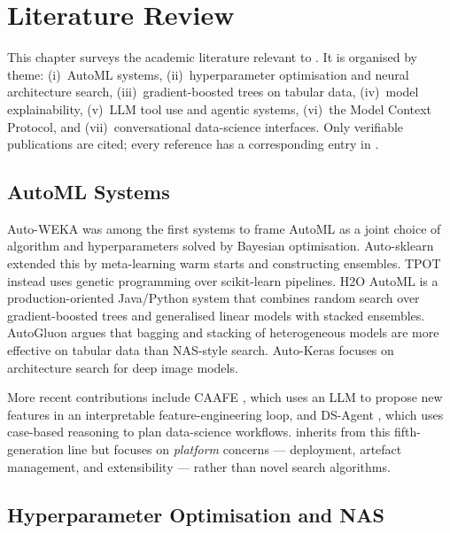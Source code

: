 \chapter{Literature Review}
\label{ch:litreview}

This chapter surveys the academic literature relevant to \projname{}.
It is organised by theme: (i)~AutoML systems, (ii)~hyperparameter
optimisation and neural architecture search, (iii)~gradient-boosted
trees on tabular data, (iv)~model explainability, (v)~LLM tool use
and agentic systems, (vi)~the Model Context Protocol, and
(vii)~conversational data-science interfaces. Only verifiable
publications are cited; every reference has a corresponding entry in
.

\section{AutoML Systems}
\label{sec:lit-automl}

Auto-WEKA \citep{thornton2013autoweka} was among the first systems to
frame AutoML as a joint choice of algorithm and hyperparameters
solved by Bayesian optimisation. Auto-sklearn
\citep{feurer2015autosklearn} extended this by meta-learning warm
starts and constructing ensembles. TPOT \citep{olson2016tpot} instead
uses genetic programming over scikit-learn pipelines. H2O AutoML
\citep{ledell2020h2o} is a production-oriented Java/Python system
that combines random search over gradient-boosted trees and
generalised linear models with stacked ensembles. AutoGluon
\citep{erickson2020autogluon} argues that bagging and stacking of
heterogeneous models are more effective on tabular data than
NAS-style search. Auto-Keras \citep{jin2019autokeras} focuses on
architecture search for deep image models.

More recent contributions include CAAFE \citep{hollmann2024caafe},
which uses an LLM to propose new features in an interpretable
feature-engineering loop, and DS-Agent \citep{guo2024dsagents}, which
uses case-based reasoning to plan data-science workflows. \projname{}
inherits from this fifth-generation line but focuses on
\emph{platform} concerns --- deployment, artefact management, and
extensibility --- rather than novel search algorithms.

\section{Hyperparameter Optimisation and NAS}
\label{sec:lit-hpo}

